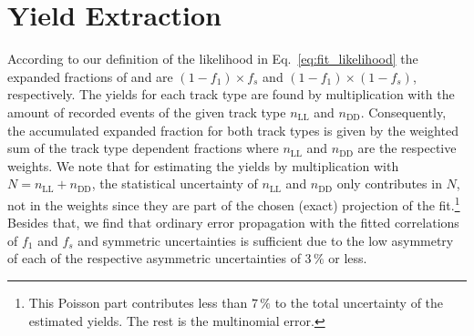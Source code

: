 \section{Yield Extraction}
\label{sec:fit_yields}
According to our definition of the likelihood in Eq.~\eqref{eq:fit_likelihood} the expanded fractions of \decay{\Lb}{\Dz\Lz} and \decay{\Xibz}{\Dz\Lz} are $(1-f_1) \times f_s$ and $(1-f_1) \times (1-f_s)$, respectively.
The yields for each track type are found by multiplication with the amount of recorded events of the given track type $n_\text{LL}$ and $n_\text{DD}$.
Consequently, the accumulated expanded fraction for both track types is given by the weighted sum of the track type dependent fractions where $n_\text{LL}$ and $n_\text{DD}$ are the respective weights.
We note that for estimating the yields by multiplication with $N=n_\text{LL} + n_\text{DD}$, the statistical uncertainty of $n_\text{LL}$ and $n_\text{DD}$ only contributes in $N$, not in the weights since they are part of the chosen (exact) projection of the fit.\footnote{This Poisson part contributes less than $7\,\%$ to the total uncertainty of the estimated yields. The rest is the multinomial error.}
Besides that, we find that ordinary error propagation with the fitted correlations of $f_1$ and $f_s$ and symmetric uncertainties is sufficient due to the low asymmetry of each of the respective asymmetric uncertainties of $3\,\%$ or less.

